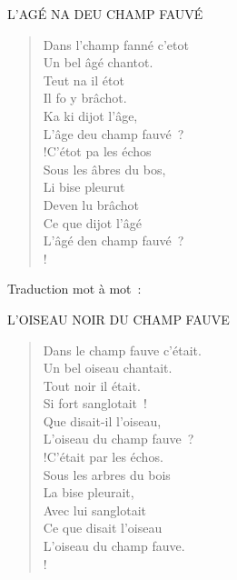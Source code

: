 \documentclass[french,twoside]{book} %
\newenvironment{quoteblock}%
  {\begin{quoting}}
  {\end{quoting}}
\newenvironment{quotebar}{%
    \def\FrameCommand{{\color{rubric!10!}\vrule width 0.5em} \hspace{0.9em}}%
    \def\OuterFrameSep{\itemsep} %
    \MakeFramed {\advance\hsize-\width \FrameRestore}
  }%
  {%
    \endMakeFramed
  }
\renewenvironment{quoteblock}%
  {%
    \savenotes
    \setstretch{0.9}
    \normalfont
    \begin{quotebar}
  }
  {%
    \end{quotebar}
    \spewnotes
  }
\begin{document}
\begin{quoteblock}
L’AGÉ NA DEU CHAMP FAUVÉ\end{quoteblock}

\begin{verse}
\hspace{1em}\hspace{1em}Dans l’champ fanné c’etot\\
\hspace{1em}\hspace{1em}Un bel âgé chantot.\\
\hspace{1em}\hspace{1em}Teut na il étot\\
\hspace{1em}\hspace{1em}Il fo y brâchot.\\
Ka ki dijot l’âge,\\
L’âge deu champ fauvé ?\\!\hspace{1em}\hspace{1em}C’étot pa les échos\\
\hspace{1em}\hspace{1em}Sous les âbres du bos,\\
\hspace{1em}\hspace{1em}Li bise pleurut\\
\hspace{1em}\hspace{1em}Deven lu brâchot \\
Ce que dijot l’âgé\\
L’âgé den champ fauvé ?\\!
\end{verse}

 \noindent Traduction mot à mot :\par

\begin{quoteblock}
L’OISEAU NOIR DU CHAMP FAUVE\end{quoteblock}

\begin{verse}
Dans le champ fauve c’était.\\
Un bel oiseau chantait.\\
Tout noir il était.\\
Si fort sanglotait !\\
Que disait-il l’oiseau,\\
L’oiseau du champ fauve ?\\!C’était par les échos.\\
Sous les arbres du bois\\
La bise pleurait,\\
Avec lui sanglotait\\
Ce que disait l’oiseau\\
L’oiseau du champ fauve.\\!
\end{verse}
\end{document}

